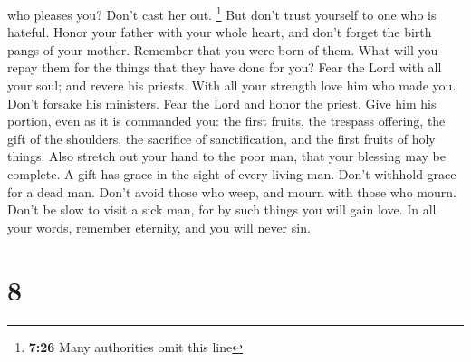 who pleases you? Don't cast her out. \footnote{\textbf{7:26} Many
  authorities omit this line} But don't trust yourself to one who is
hateful.  Honor your father with your whole heart, and
don't forget the birth pangs of your mother.  Remember
that you were born of them. What will you repay them for the things that
they have done for you?  Fear the Lord with all your
soul; and revere his priests.  With all your strength
love him who made you. Don't forsake his ministers.  Fear
the Lord and honor the priest. Give him his portion, even as it is
commanded you: the first fruits, the trespass offering, the gift of the
shoulders, the sacrifice of sanctification, and the first fruits of holy
things.  Also stretch out your hand to the poor man, that
your blessing may be complete.  A gift has grace in the
sight of every living man. Don't withhold grace for a dead man.
 Don't avoid those who weep, and mourn with those who
mourn.  Don't be slow to visit a sick man, for by such
things you will gain love.  In all your words, remember
eternity, and you will never sin.

\hypertarget{section-6}{%
\section{8}\label{section-6}}

